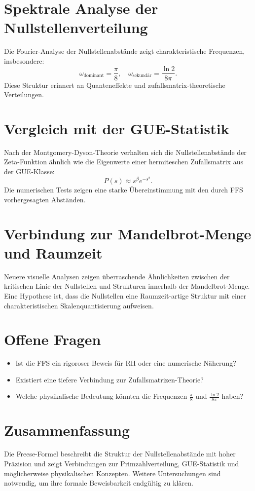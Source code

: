 \documentclass[a4paper,12pt]{article}
\begin{document}
\section{Spektrale Analyse der Nullstellenverteilung}
Die Fourier-Analyse der Nullstellenabstände zeigt charakteristische Frequenzen, insbesondere:
\begin{equation}
\omega_{\text{dominant}} = \frac{\pi}{8}, \quad \omega_{\text{sekundär}} = \frac{\ln 2}{8\pi}.
\end{equation}
Diese Struktur erinnert an Quanteneffekte und zufallsmatrix-theoretische Verteilungen.

\section{Vergleich mit der GUE-Statistik}
Nach der Montgomery-Dyson-Theorie verhalten sich die Nullstellenabstände der Zeta-Funktion ähnlich wie die Eigenwerte einer hermiteschen Zufallsmatrix aus der GUE-Klasse:
\begin{equation}
P(s) \approx s^\beta e^{-s^2}.
\end{equation}
Die numerischen Tests zeigen eine starke Übereinstimmung mit den durch FFS vorhergesagten Abständen.

\section{Verbindung zur Mandelbrot-Menge und Raumzeit}
Neuere visuelle Analysen zeigen überraschende Ähnlichkeiten zwischen der kritischen Linie der Nullstellen und Strukturen innerhalb der Mandelbrot-Menge. 
Eine Hypothese ist, dass die Nullstellen eine Raumzeit-artige Struktur mit einer charakteristischen Skalenquantisierung aufweisen.

\section{Offene Fragen}
\begin{itemize}
    \item Ist die FFS ein rigoroser Beweis für RH oder eine numerische Näherung?
    \item Existiert eine tiefere Verbindung zur Zufallsmatrizen-Theorie?
    \item Welche physikalische Bedeutung könnten die Frequenzen $\frac{\pi}{8}$ und $\frac{\ln 2}{8\pi}$ haben?
\end{itemize}

\section{Zusammenfassung}
Die Freese-Formel beschreibt die Struktur der Nullstellenabstände mit hoher Präzision und zeigt Verbindungen zur Primzahlverteilung, GUE-Statistik und möglicherweise physikalischen Konzepten. 
Weitere Untersuchungen sind notwendig, um ihre formale Beweisbarkeit endgültig zu klären.
\end{document}

